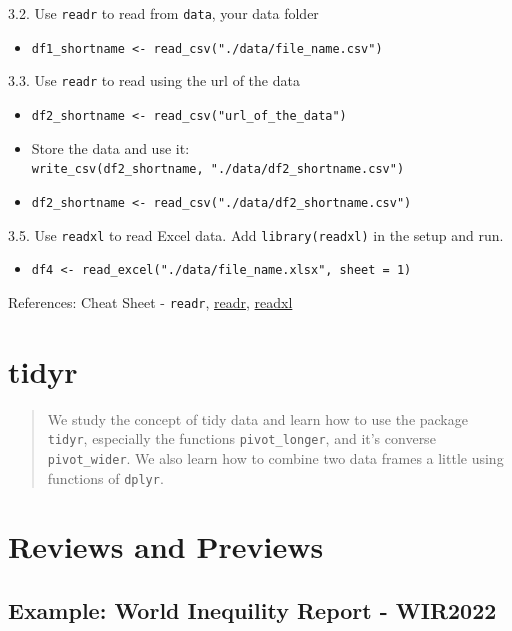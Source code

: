 \documentclass[
  xelatex, ja=standard]{bxjsbook}
\providecommand{\tightlist}{%
  \setlength{\itemsep}{0pt}\setlength{\parskip}{0pt}}
\theoremstyle{definition}
\theoremstyle{definition}
\theoremstyle{definition}
\theoremstyle{definition}
\theoremstyle{remark}
\begin{document}
3.2. Use \texttt{readr} to read from \texttt{data}, your data folder

\begin{itemize}
\tightlist
\item
  \texttt{df1\_shortname\ \textless{}-\ read\_csv("./data/file\_name.csv")}
\end{itemize}

3.3. Use \texttt{readr} to read using the url of the data

\begin{itemize}
\tightlist
\item
  \texttt{df2\_shortname\ \textless{}-\ read\_csv("url\_of\_the\_data")}
\item
  Store the data and use it: \texttt{write\_csv(df2\_shortname,\ "./data/df2\_shortname.csv")}
\item
  \texttt{df2\_shortname\ \textless{}-\ read\_csv("./data/df2\_shortname.csv")}
\end{itemize}

3.5. Use \texttt{readxl} to read Excel data. Add \texttt{library(readxl)} in the setup and run.

\begin{itemize}
\tightlist
\item
  \texttt{df4\ \textless{}-\ read\_excel("./data/file\_name.xlsx",\ sheet\ =\ 1)}
\end{itemize}

References: Cheat Sheet - \texttt{readr}, \href{https://readr.tidyverse.org}{readr}, \href{https://readxl.tidyverse.org}{readxl}

\hypertarget{tidyr}{%
\section{tidyr}\label{tidyr}}

\begin{quote}
We study the concept of tidy data and learn how to use the package \texttt{tidyr}, especially the functions \texttt{pivot\_longer}, and it's converse \texttt{pivot\_wider}. We also learn how to combine two data frames a little using functions of \texttt{dplyr}.
\end{quote}

\hypertarget{reviews-and-previews}{%
\section{Reviews and Previews}\label{reviews-and-previews}}

\hypertarget{example-world-inequility-report---wir2022}{%
\subsection{Example: World Inequility Report - WIR2022}\label{example-world-inequility-report---wir2022}}
\end{document}
